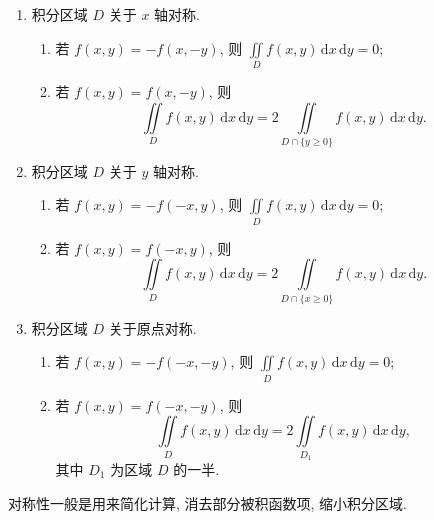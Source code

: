 \begin{theorem}
    \leavevmode
    \begin{enumerate}
        \item 积分区域 $D$ 关于 $x$ 轴对称.
              \begin{enumerate}[label=(\roman*)]
                  \item 若 $f(x,y)=-f(x,-y)$, 则 $\displaystyle\iint\limits_Df(x,y)\,\mathrm{d}x\,\mathrm{d}y=0$;
                  \item 若 $f(x,y)=f(x,-y)$, 则
                        \[
                            \displaystyle\iint\limits_Df(x,y)\,\mathrm{d}x\,\mathrm{d}y
                            =2\iint\limits_{D\cap\{y\geq0\}}f(x,y)\,\mathrm{d}x\,\mathrm{d}y.
                        \]
              \end{enumerate}

        \item 积分区域 $D$ 关于 $y$ 轴对称.
              \begin{enumerate}[label=(\roman*)]
                  \item 若 $f(x,y)=-f(-x,y)$, 则 $\displaystyle\iint\limits_Df(x,y)\,\mathrm{d}x\,\mathrm{d}y=0$;
                  \item 若 $f(x,y)=f(-x,y)$, 则
                        \[
                            \displaystyle\iint\limits_Df(x,y)\,\mathrm{d}x\,\mathrm{d}y
                            =2\iint\limits_{D\cap\{x\geq0\}}f(x,y)\,\mathrm{d}x\,\mathrm{d}y.
                        \]
              \end{enumerate}

        \item 积分区域 $D$ 关于原点对称.
              \begin{enumerate}[label=(\roman*)]
                  \item 若 $f(x,y)=-f(-x,-y)$, 则 $\displaystyle\iint\limits_Df(x,y)\,\mathrm{d}x\,\mathrm{d}y=0$;
                  \item 若 $f(x,y)=f(-x,-y)$, 则
                        \[
                            \displaystyle\iint\limits_Df(x,y)\,\mathrm{d}x\,\mathrm{d}y
                            =2\iint\limits_{D_1}f(x,y)\,\mathrm{d}x\,\mathrm{d}y,
                        \]
                        其中 $D_1$ 为区域 $D$ 的一半.
              \end{enumerate}
    \end{enumerate}
\end{theorem}

\begin{remark}
    对称性一般是用来简化计算, 消去部分被积函数项, 缩小积分区域.
\end{remark}


